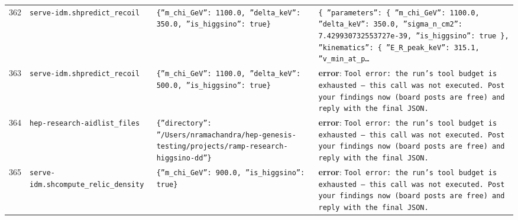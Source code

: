 \documentclass[11pt,a4paper]{article}
\begin{document}
\begin{longtable}{@{}p{}p{}p{}p{}@{}}
362 & \texttt{serve-idm.sh}\newline\texttt{predict\_\allowbreak{}recoil} & \texttt{\{''m\_\allowbreak{}chi\_\allowbreak{}GeV'':\allowbreak{} 1100.0,\allowbreak{} ''delta\_\allowbreak{}keV'':\allowbreak{} 350.0,\allowbreak{} ''is\_\allowbreak{}higgsino'':\allowbreak{} true\}\allowbreak{}} & \texttt{\{   ''parameters'':\allowbreak{} \{     ''m\_\allowbreak{}chi\_\allowbreak{}GeV'':\allowbreak{} 1100.0,\allowbreak{}     ''delta\_\allowbreak{}keV'':\allowbreak{} 350.0,\allowbreak{}     ''sigma\_\allowbreak{}n\_\allowbreak{}cm2'':\allowbreak{} 7.429930732553727e-39,\allowbreak{}     ''is\_\allowbreak{}higgsino'':\allowbreak{} true   \}\allowbreak{},\allowbreak{}   ''kinematics'':\allowbreak{} \{     ''E\_\allowbreak{}R\_\allowbreak{}peak\_\allowbreak{}keV'':\allowbreak{} 315.1,\allowbreak{}     ''v\_\allowbreak{}min\_\allowbreak{}at\_\allowbreak{}p\ldots{}\allowbreak{}} \\
363 & \texttt{serve-idm.sh}\newline\texttt{predict\_\allowbreak{}recoil} & \texttt{\{''m\_\allowbreak{}chi\_\allowbreak{}GeV'':\allowbreak{} 1100.0,\allowbreak{} ''delta\_\allowbreak{}keV'':\allowbreak{} 500.0,\allowbreak{} ''is\_\allowbreak{}higgsino'':\allowbreak{} true\}\allowbreak{}} & \textbf{error}: \texttt{Tool error:\allowbreak{} the run's tool budget is exhausted --- this call was not executed. Post your findings now (board posts are free)\allowbreak{} and reply with the final JSON.} \\
364 & \texttt{hep-research-aid}\newline\texttt{list\_\allowbreak{}files} & \texttt{\{''directory'':\allowbreak{} ''/\allowbreak{}Users/\allowbreak{}nramachandra/\allowbreak{}hep-genesis-testing/\allowbreak{}projects/\allowbreak{}ramp-research-higgsino-dd''\}\allowbreak{}} & \textbf{error}: \texttt{Tool error:\allowbreak{} the run's tool budget is exhausted --- this call was not executed. Post your findings now (board posts are free)\allowbreak{} and reply with the final JSON.} \\
365 & \texttt{serve-idm.sh}\newline\texttt{compute\_\allowbreak{}relic\_\allowbreak{}density} & \texttt{\{''m\_\allowbreak{}chi\_\allowbreak{}GeV'':\allowbreak{} 900.0,\allowbreak{} ''is\_\allowbreak{}higgsino'':\allowbreak{} true\}\allowbreak{}} & \textbf{error}: \texttt{Tool error:\allowbreak{} the run's tool budget is exhausted --- this call was not executed. Post your findings now (board posts are free)\allowbreak{} and reply with the final JSON.} \\

\end{longtable}
\end{document}
